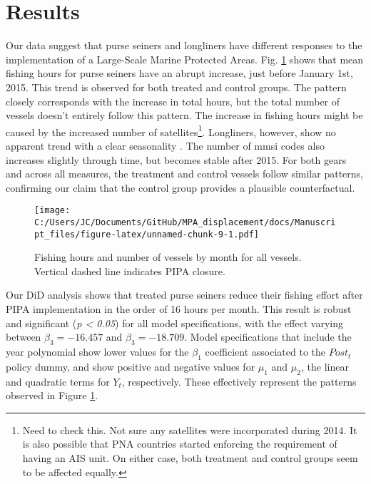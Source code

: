 \documentclass[12pt,]{article}
\let\rmarkdownfootnote\footnote%
\def\footnote{\protect\rmarkdownfootnote}
\begin{document}
\clearpage

\section{Results}\label{results}

Our data suggest that purse seiners and longliners have different
responses to the implementation of a Large-Scale Marine Protected Areas.
Fig. \ref{fig:all_vessels} shows that mean fishing hours for purse
seiners have an abrupt increase, just before January 1st, 2015. This
trend is observed for both treated and control groups. The pattern
closely corresponds with the increase in total hours, but the total
number of vessels doesn't entirely follow this pattern. The increase in
fishing hours might be caused by the increased number of
satellites\footnote{Need to check this. Not sure any satellites were
  incorporated during 2014. It is also possible that PNA countries
  started enforcing the requirement of having an AIS unit. On either
  case, both treatment and control groups seem to be affected equally.}.
Longliners, however, show no apparent trend with a clear seasonality
\citep{ortuocrespo_2018}. The number of mmsi codes also increases
slightly through time, but becomes stable after 2015. For both gears and
across all measures, the treatment and control vessels follow similar
patterns, confirming our claim that the control group provides a
plausible counterfactual.

\begin{figure}
\centering
\texttt{[image: C:/Users/JC/Documents/GitHub/MPA\_displacement/docs/Manuscript\_files/figure-latex/unnamed-chunk-9-1.pdf]}
\caption{\label{fig:unnamed-chunk-9}\label{fig:all_vessels}Fishing hours and
number of vessels by month for all vessels. Vertical dashed line
indicates PIPA closure.}
\end{figure}

Our DiD analysis shows that treated purse seiners reduce their fishing
effort after PIPA implementation in the order of 16 hours per month.
This result is robust and significant (\emph{p \textless{} 0.05}) for
all model specifications, with the effect varying between
\(\beta_3 = -16.457\) and \(\beta_3 = -18.709\). Model specifications
that include the year polynomial show lower values for the \(\beta_1\)
coefficient associated to the \(Post_t\) policy dummy, and show positive
and negative values for \(\mu_1\) and \(\mu_2\), the linear and
quadratic terms for \(Y_t\), respectively. These effectively represent
the patterns observed in Figure \ref{fig:all_vessels}.
\end{document}
